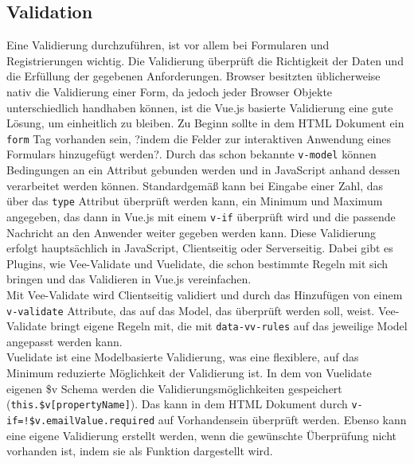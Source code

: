 \subsection*{Validation}
Eine Validierung durchzuf\"uhren, ist vor allem bei Formularen und Registrierungen wichtig. Die Validierung \"uberpr\"uft die Richtigkeit der Daten und die Erf\"ullung der gegebenen Anforderungen. Browser besitzten \"ublicherweise nativ die Validierung einer Form, da jedoch jeder Browser Objekte unterschiedlich handhaben k\"onnen, ist die Vue.js basierte Validierung eine gute L\"osung, um einheitlich zu bleiben. Zu Beginn sollte in dem \ac{HTML} Dokument ein \texttt{form} Tag vorhanden sein, ?indem die Felder zur interaktiven Anwendung eines Formulars hinzugef\"ugt werden?. Durch das schon bekannte \texttt{v-model} k\"onnen Bedingungen an ein Attribut gebunden werden und in JavaScript anhand dessen verarbeitet werden k\"onnen.
Standardgem\"a\ss{} kann bei Eingabe einer Zahl, das \"uber das \texttt{type} Attribut \"uberpr\"uft werden kann, ein Minimum und Maximum angegeben, das dann in Vue.js mit einem \texttt{v-if} \"uberpr\"uft wird und die passende Nachricht an den Anwender weiter gegeben werden kann. Diese Validierung erfolgt haupts\"achlich in JavaScript, Clientseitig oder Serverseitig. Dabei gibt es Plugins, wie Vee-Validate und Vuelidate, die schon bestimmte Regeln mit sich bringen und das Validieren in Vue.js vereinfachen\cite{VueDokumentationValidierung2018}.\\
Mit Vee-Validate wird Clientseitig validiert und durch das Hinzuf\"ugen von einem \texttt{v-validate} Attribute, das auf das Model, das \"uberpr\"uft werden soll, weist. Vee-Validate bringt eigene Regeln mit, die mit \texttt{data-vv-rules} auf das jeweilige Model angepasst werden kann\cite{BemenderferVeeValidate2017}.\\
Vuelidate ist eine Modelbasierte Validierung, was eine flexiblere, auf das Minimum  reduzierte M\"oglichkeit der Validierung ist. In dem von Vuelidate eigenen \$v Schema werden die Validierungsm\"oglichkeiten gespeichert (\texttt{this.\$v[propertyName]}). Das kann in dem \ac{HTML} Dokument durch \texttt{v-if=\grqq !\$v.emailValue.required\grqq} auf Vorhandensein \"uberpr\"uft werden. Ebenso kann eine eigene Validierung erstellt werden, wenn die gew\"unschte \"Uberpr\"ufung nicht vorhanden ist, indem  sie als Funktion dargestellt wird\cite{BemenderferVuelidate2017}.

